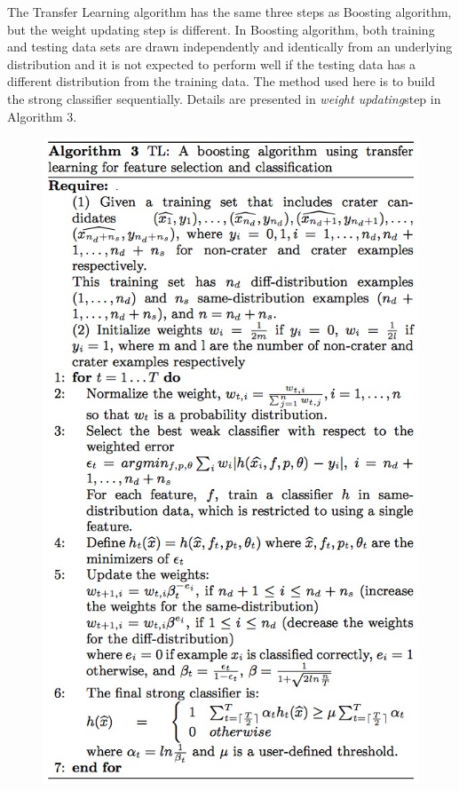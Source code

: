 \documentclass[conference]{IEEEtran}
\begin{document}
The Transfer Learning algorithm has the same three steps as Boosting algorithm, but the weight updating step is different. In Boosting algorithm, both training and testing data sets are drawn independently and identically from an underlying distribution and it is not expected to perform well if the testing data has a different distribution from the training data. The method used here is to build the  strong classifier sequentially. Details are presented in {\it weight updating}step in Algorithm 3\cite{ding2011subkilometer}.

\begin{figure}[!hb]
\begin{center}
\includegraphics[scale=0.45]{TL.png}
\label{default}
\end{center}
\end{figure}
\end{document}
